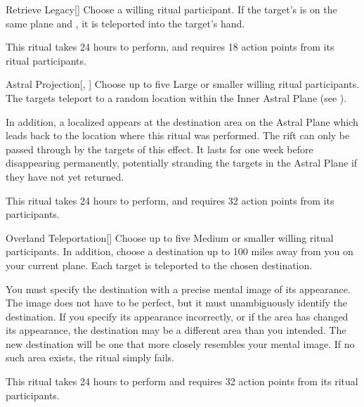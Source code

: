 \lowercase{\hypertarget{spell:Retrieve Legacy}{}}\label{spell:Retrieve Legacy}
\begin{freeability}[\nth{3}]{\hypertarget{spell:Retrieve Legacy}{Retrieve Legacy}}[]
Choose a willing ritual participant.
If the target's  is on the same plane and , it is teleported into the target's hand.

This ritual takes 24 hours to perform, and requires 18 action points from its ritual participants.
\end{freeability}
\vspace{0.25em}



\lowercase{\hypertarget{spell:Astral Projection}{}}\label{spell:Astral Projection}
\begin{freeability}[\nth{4}]{\hypertarget{spell:Astral Projection}{Astral Projection}}[, ]
Choose up to five Large or smaller willing ritual participants.
The targets teleport to a random location within the Inner Astral Plane (see ).

In addition, a localized  appears at the destination area on the Astral Plane which leads back to the location where this ritual was performed.
The rift can only be passed through by the targets of this effect.
It lasts for one week before disappearing permanently, potentially stranding the targets in the Astral Plane if they have not yet returned.

This ritual takes 24 hours to perform, and requires 32 action points from its participants.
\end{freeability}
\vspace{0.25em}



\lowercase{\hypertarget{spell:Overland Teleportation}{}}\label{spell:Overland Teleportation}
\begin{freeability}[\nth{4}]{\hypertarget{spell:Overland Teleportation}{Overland Teleportation}}[]
Choose up to five Medium or smaller willing ritual participants.
In addition, choose a destination up to 100 miles away from you on your current plane.
Each target is teleported to the chosen destination.

You must specify the destination with a precise mental image of its appearance.
The image does not have to be perfect, but it must unambiguously identify the destination.
If you specify its appearance incorrectly, or if the area has changed its appearance, the destination may be a different area than you intended.
The new destination will be one that more closely resembles your mental image.
If no such area exists, the ritual simply fails.

This ritual takes 24 hours to perform and requires 32 action points from its ritual participants.
\end{freeability}
\vspace{0.25em}




